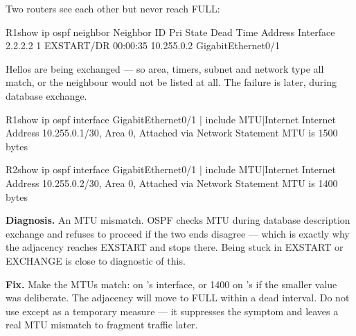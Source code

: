 \begin{breakfix}
Two routers see each other but never reach FULL:

\begin{verify}{R1}{show ip ospf neighbor}
Neighbor ID     Pri   State           Dead Time   Address         Interface
2.2.2.2           1   EXSTART/DR      00:00:35    10.255.0.2      GigabitEthernet0/1
\end{verify}

Hellos are being exchanged --- so area, timers, subnet and network type all match,
or the neighbour would not be listed at all. The failure is later, during database
exchange.

\begin{verify}{R1}{show ip ospf interface GigabitEthernet0/1 | include MTU|Internet}
  Internet Address 10.255.0.1/30, Area 0, Attached via Network Statement
  MTU is 1500 bytes
\end{verify}

\begin{verify}{R2}{show ip ospf interface GigabitEthernet0/1 | include MTU|Internet}
  Internet Address 10.255.0.2/30, Area 0, Attached via Network Statement
  MTU is 1400 bytes
\end{verify}

\textbf{Diagnosis.} An MTU mismatch. OSPF checks MTU during database description
exchange and refuses to proceed if the two ends disagree --- which is exactly why
the adjacency reaches EXSTART and stops there. Being stuck in EXSTART or EXCHANGE
is close to diagnostic of this.

\textbf{Fix.} Make the MTUs match:  on 's interface, or
1400 on 's if the smaller value was deliberate. The adjacency will move to
FULL within a dead interval. Do not use  except as a
temporary measure --- it suppresses the symptom and leaves a real MTU mismatch to
fragment traffic later.
\end{breakfix}


